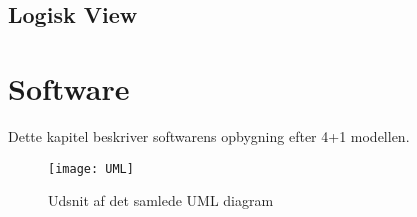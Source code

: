 \documentclass[Main]{subfiles}
\begin{document}
\section{Logisk View}
\chapter{Software}
Dette kapitel beskriver softwarens opbygning efter 4+1 modellen. 







\begin{figure}[H]
\centering
\texttt{[image: UML]}
\caption{Udsnit af det samlede UML diagram}
\end{figure}
\end{document}
